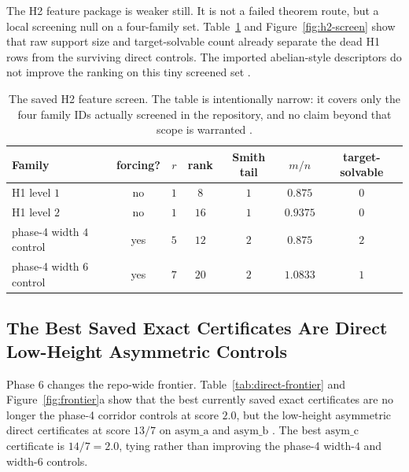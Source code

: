 \documentclass[11pt]{article}
\theoremstyle{definition}
\begin{document}
The H2 feature package is weaker still. It is not a failed theorem route, but a local screening null on a four-family set. Table~\ref{tab:h2} and Figure~\ref{fig:h2-screen} show that raw support size and target-solvable count already separate the dead \textsc{H1} rows from the surviving direct controls. The imported abelian-style descriptors do not improve the ranking on this tiny screened set \citep{archivara_h2}.

\begin{table}[H]
\centering
\small
\begin{tabular}{lcccccc}
\toprule
Family & forcing? & $r$ & rank & Smith tail & $m/n$ & target-solvable \\
\midrule
\textsc{H1} level $1$ & no & $1$ & $8$ & $1$ & $0.875$ & $0$ \\
\textsc{H1} level $2$ & no & $1$ & $16$ & $1$ & $0.9375$ & $0$ \\
phase-4 width $4$ control & yes & $5$ & $12$ & $2$ & $0.875$ & $2$ \\
phase-4 width $6$ control & yes & $7$ & $20$ & $2$ & $1.0833$ & $1$ \\
\bottomrule
\end{tabular}
\caption{The saved H2 feature screen. The table is intentionally narrow: it covers only the four family IDs actually screened in the repository, and no claim beyond that scope is warranted \citep{archivara_h2,archivara_verification}.}
\label{tab:h2}
\end{table}

\subsection{The Best Saved Exact Certificates Are Direct Low-Height Asymmetric Controls}

Phase 6 changes the repo-wide frontier. Table~\ref{tab:direct-frontier} and Figure~\ref{fig:frontier}a show that the best currently saved exact certificates are no longer the phase-4 corridor controls at score $2.0$, but the low-height asymmetric direct certificates at score $13/7$ on $\mathrm{asym\_a}$ and $\mathrm{asym\_b}$ \citep{archivara_h5_affine_shell}. The best $\mathrm{asym\_c}$ certificate is $14/7=2.0$, tying rather than improving the phase-4 width-$4$ and width-$6$ controls.
\end{document}
